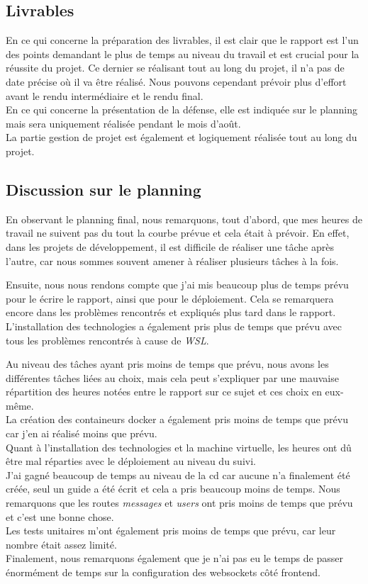 \documentclass[
    iai, %
    il, %
]{heig-tb}
\begin{document}
\subsection{Livrables}
En ce qui concerne la préparation des livrables, il est clair que le rapport est l'un des points
demandant le plus de temps au niveau du travail et est crucial pour la réussite du projet. Ce
dernier se réalisant tout au long du projet, il n'a pas de date précise où il va être réalisé. Nous
pouvons cependant prévoir plus d'effort avant le rendu intermédiaire et le rendu final.\\
En ce qui concerne la présentation de la défense, elle est indiquée sur le planning mais sera uniquement réalisée pendant le mois d'août.\\
La partie gestion de projet est également et logiquement réalisée tout au long du projet.

\subsection{Discussion sur le planning}
En observant le planning final, nous remarquons, tout d'abord, que mes heures de travail ne suivent pas du tout la courbe prévue et cela était à prévoir. En effet, dans les projets de développement, il est difficile de réaliser une tâche après l'autre, car nous sommes souvent amener à réaliser plusieurs tâches à la fois.

Ensuite, nous nous rendons compte que j'ai mis beaucoup plus de temps prévu pour le écrire le rapport, ainsi que pour le déploiement. Cela se remarquera encore dans les problèmes rencontrés et expliqués plus tard dans le rapport. L'installation des technologies a également pris plus de temps que prévu avec tous les problèmes rencontrés à cause de \emph{WSL}.

Au niveau des tâches ayant pris moins de temps que prévu, nous avons les différentes tâches liées au choix, mais cela peut s'expliquer par une mauvaise répartition des heures notées entre le rapport sur ce sujet et ces choix en eux-même. \\
La création des containeurs \Gls{docker} a également pris moins de temps que prévu car j'en ai réalisé moins que prévu. \\
Quant à l'installation des technologies et la machine virtuelle, les heures ont dû être mal réparties avec le déploiement au niveau du suivi. \\
J'ai gagné beaucoup de temps au niveau de la \Gls{cd} car aucune n'a finalement été créée, seul un guide a été écrit et cela a pris beaucoup moins de temps.
Nous remarquons que les routes \emph{messages} et \emph{users} ont pris moins de temps que prévu et c'est une bonne chose. \\
Les tests unitaires m'ont également pris moins de temps que prévu, car leur nombre était assez limité. \\
Finalement, nous remarquons également que je n'ai pas eu le temps de passer énormément de temps sur la configuration des \Gls{websockets} côté \Gls{frontend}.
\end{document}
